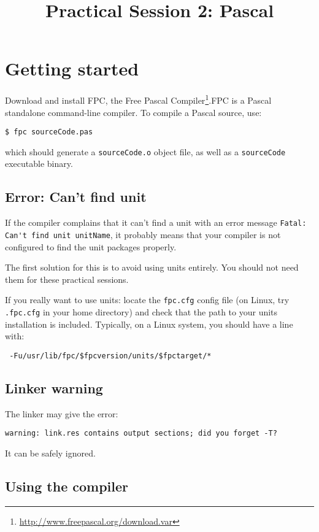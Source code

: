 \documentclass{../../tp}
\title{Practical Session 2: Pascal}
\author{}
\begin{document}
\maketitle


\section{Getting started}

Download and install \textsf{FPC}, the \textsf{Free Pascal Compiler}\footnote{ \url{http://www.freepascal.org/download.var}}.\textsf{FPC} is a \textsf{Pascal} standalone command-line compiler. To compile a \textsf{Pascal} source, use: 

\verb|$ fpc sourceCode.pas|

which should generate a \verb|sourceCode.o| object file, as well as a \verb|sourceCode| executable binary.

\subsection{Error: Can't find unit}

If the compiler complains that it can't find a unit with an error message \verb|Fatal: Can't find unit unitName|, it probably means that your compiler is not configured to find the unit packages properly.

The first solution for this is to avoid using units entirely. You should not need them for these practical sessions.

If you really want to use units: locate the \verb|fpc.cfg| config file (on Linux, try \verb|.fpc.cfg| in your home directory) and check that the path to your units installation is included. Typically, on a Linux system, you should have a line with:

\verb| -Fu/usr/lib/fpc/$fpcversion/units/$fpctarget/*|

\subsection{Linker warning}

The linker may give the error:

\verb|warning: link.res contains output sections; did you forget -T?|

It can be safely ignored. 

\subsection{Using the compiler}
\end{document}
